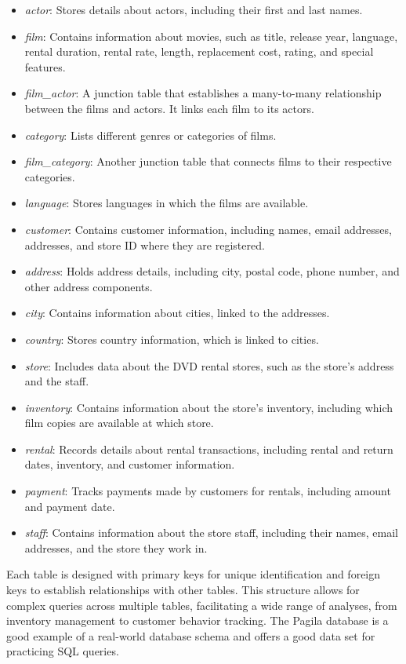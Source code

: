 \begin{itemize}
  \item \emph{actor}: Stores details about actors, including their first and last names.
  \item \emph{film}: Contains information about movies, such as title, release year, language, rental duration, rental rate, length, replacement cost, rating, and special features.
  \item \emph{film\_actor}: A junction table that establishes a many-to-many relationship between the films and actors. It links each film to its actors.
  \item \emph{category}: Lists different genres or categories of films.
  \item \emph{film\_category}: Another junction table that connects films to their respective categories.
  \item \emph{language}: Stores languages in which the films are available.
  \item \emph{customer}: Contains customer information, including names, email addresses, addresses, and store ID where they are registered.
  \item \emph{address}: Holds address details, including city, postal code, phone number, and other address components.
  \item \emph{city}: Contains information about cities, linked to the addresses.
  \item \emph{country}: Stores country information, which is linked to cities.
  \item \emph{store}: Includes data about the DVD rental stores, such as the store's address and the staff.
  \item \emph{inventory}: Contains information about the store's inventory, including which film copies are available at which store.
  \item \emph{rental}: Records details about rental transactions, including rental and return dates, inventory, and customer information.
  \item \emph{payment}: Tracks payments made by customers for rentals, including amount and payment date.
  \item \emph{staff}: Contains information about the store staff, including their names, email addresses, and the store they work in.
\end{itemize}

Each table is designed with primary keys for unique identification and foreign keys to establish relationships with other tables. This structure allows for complex queries across multiple tables, facilitating a wide range of analyses, from inventory management to customer behavior tracking. The Pagila database is a good example of a real-world database schema and offers a good data set for practicing SQL queries.

